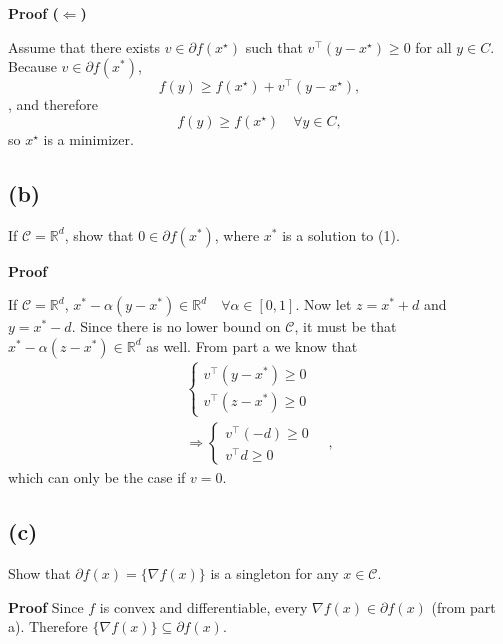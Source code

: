 \documentclass[11pt]{article}
\begin{document}
\textbf{Proof ($\Leftarrow$)} 

Assume that there exists $v \in \partial f(x^\star)$ such that $v^\top (y - x^\star) \ge 0$ for all $y \in C$. Because $v \in \partial f(x^*)$,
\begin{equation}\label{1a2}
    f(y) \ge f(x^\star) + v^\top (y - x^\star), 
\end{equation}
, and therefore
\[
f(y) \ge f(x^\star) \quad \forall y \in C,
\]
so $x^\star$ is a minimizer.

\hrulefill

\subsection*{(b)}
If $\mathcal{C} = \mathbb{R}^d$, show that $0 \in \partial f(x^*)$, where $x^*$ is a solution
to (1).

\hrulefill

\textbf{Proof}

If $\mathcal{C} = \mathbb{R}^d$, $x^* - \alpha(y-x^*) \in \mathbb{R}^d \quad \forall \alpha \in [0,1]$. Now let $z = x^* + d$ and $y = x^* - d$. Since there is no lower bound on $\mathcal{C}$, it must be that $x^* - \alpha(z - x^*) \in \mathbb{R}^d$ as well. From part a we know that
\begin{align*}
    \begin{cases}
        v^\top (y - x^*) \geq 0 \\
        v^\top (z - x^*) \geq 0
    \end{cases} \\
    \Rightarrow
    \begin{cases}
        v^\top (-d) \geq 0 \\
        v^\top d \geq 0
    \end{cases}\quad,
\end{align*}
which can only be the case if $v = 0$.

\hrulefill

\subsection*{(c)}

Show that $\partial f(x) = \{\nabla f(x)\}$ is a singleton for any $x \in \mathcal{C}$.

\hrulefill

\textbf{Proof}
Since $f$ is convex and differentiable, every $\nabla f(x) \in \partial f(x)$ (from part a). Therefore $\{\nabla f(x)\} \subseteq \partial f(x)$.
\end{document}
